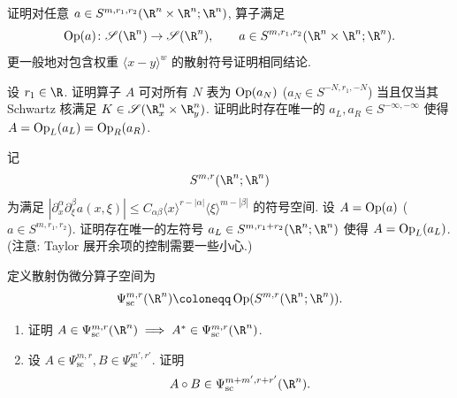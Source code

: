 \begin{exer}\label{ex:4.15}
证明对任意 $a \in S^{m, r_1, r_2}(\R^n \times \R^n; \R^n)$, 算子满足
\begin{equation}\label{eq:4.173}
    \Op(a) \colon \Schwartz(\R^n) \to \Schwartz(\R^n), \qquad a \in S^{m, r_1, r_2}(\R^n \times \R^n; \R^n).
\end{equation}
更一般地对包含权重 $\langle x - y \rangle^w$ 的散射符号证明相同结论.
\end{exer}

\begin{exer}\label{ex:4.16}
设 $r_1 \in \R$. 证明算子 $A$ 可对所有 $N$ 表为 $\operatorname{Op}(a_N)$ ($a_N \in S^{-N, r_1, -N}$) 当且仅当其 Schwartz 核满足 $K \in \Schwartz(\R_x^n \times \R_y^n)$. 证明此时存在唯一的 $a_L, a_R \in S^{-\infty, -\infty}$ 使得 $A = \operatorname{Op}_L(a_L) = \operatorname{Op}_R(a_R)$.
\end{exer}

\begin{exer}\label{ex:4.17}
记
\begin{equation}\label{eq:4.174}
    S^{m, r}(\R^n; \R^n)
\end{equation}
为满足 $|\partial_x^\alpha \partial_\xi^\beta a(x, \xi)| \le C_{\alpha\beta} \langle x \rangle^{r - |\alpha|} \langle \xi \rangle^{m - |\beta|}$ 的符号空间. 设 $A = \operatorname{Op}(a)$ ($a \in S^{m, r_1, r_2}$). 证明存在唯一的左符号 $a_L \in S^{m, r_1+r_2}(\R^n; \R^n)$ 使得 $A = \operatorname{Op}_L(a_L)$. (注意: Taylor 展开余项的控制需要一些小心.)
\end{exer}

\begin{exer}\label{ex:4.18}
定义散射伪微分算子空间为
\begin{equation}\label{eq:4.175}
    \Psi_{\mathrm{sc}}^{m, r}(\R^n) \defeq \Op(S^{m, r}(\R^n; \R^n)).
\end{equation}
\begin{enumerate}
    \item 证明 $A \in \Psi_{\mathrm{sc}}^{m, r}(\R^n) \implies A^* \in \Psi_{\mathrm{sc}}^{m, r}(\R^n)$.
    \item 设 $A \in \Psi_{\mathrm{sc}}^{m, r}, B \in \Psi_{\mathrm{sc}}^{m', r'}$. 证明
    \begin{equation}\label{eq:4.176}
        A \circ B \in \Psi_{\mathrm{sc}}^{m+m', r+r'}(\R^n).
    \end{equation}
\end{enumerate}
\end{exer}

